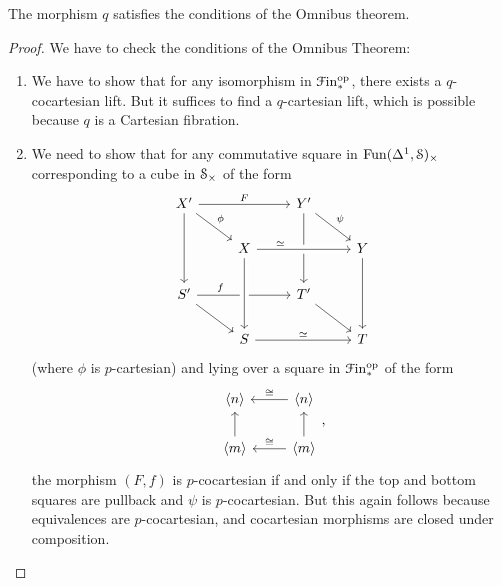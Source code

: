 \documentclass[main.tex]{subfiles}
\begin{document}
\begin{lemma}
  The morphism $q$ satisfies the conditions of the Omnibus theorem.
\end{lemma}
\begin{proof}
  We have to check the conditions of the Omnibus Theorem:
  \begin{enumerate}
    \item We have to show that for any isomorphism in $\Finp\op$, there exists a $q$-cocartesian lift. But it suffices to find a $q$-cartesian lift, which is possible because $q$ is a Cartesian fibration.

    \item We need to show that for any commutative square in $\Fun(\Delta^{1}, \S)_{\times}$ corresponding to a cube in $\S_{\times}$ of the form
      \begin{equation*}
        \begin{tikzcd}
          X'
          \arrow[rr, "F"]
          \arrow[dd]
          \arrow[dr, "\phi"]
          && Y'
          \arrow[dd]
          \arrow[dr, "\psi"]
          \\
          & X
          \arrow[rr, crossing over, near start, "\simeq"]
          && Y
          \arrow[dd]
          \\
          S'
          \arrow[dr]
          \arrow[rr, near start, "f"]
          && T'
          \arrow[dr]
          \\
          & S
          \arrow[from=uu, crossing over]
          \arrow[rr, "\simeq"]
          && T
        \end{tikzcd}
      \end{equation*}
      (where $\phi$ is $p$-cartesian) and lying over a square in $\Finp\op$ of the form
      \begin{equation*}
        \begin{tikzcd}
          \langle n \rangle
          & \langle n \rangle
          \arrow[l, swap, "\cong"]
          \\
          \langle m \rangle
          \arrow[u]
          & \langle m \rangle
          \arrow[l, swap, "\cong"]
          \arrow[u]
        \end{tikzcd},
      \end{equation*}
      the morphism $(F, f)$ is $p$-cocartesian if and only if the top and bottom squares are pullback and $\psi$ is $p$-cocartesian. But this again follows because equivalences are $p$-cocartesian, and cocartesian morphisms are closed under composition.
  \end{enumerate}
\end{proof}
\end{document}
